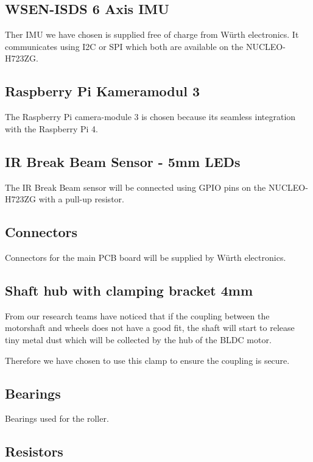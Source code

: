 \documentclass[a4paper,12pt]{article}
\begin{document}
  \subsection*{WSEN-ISDS 6 Axis IMU}

  Ther IMU we have chosen is supplied free of charge from Würth
  electronics. It communicates using I2C or SPI which both are available
  on the NUCLEO-H723ZG.

  \subsection*{Raspberry Pi Kameramodul 3}

  The Raspberry Pi camera-module 3 is chosen because its seamless
  integration with the Raspberry Pi 4.

  \subsection*{IR Break Beam Sensor - 5mm LEDs}

  The IR Break Beam sensor will be connected using GPIO pins on the
  NUCLEO-H723ZG with a pull-up resistor.

  \subsection*{Connectors}

  Connectors for the main PCB board will be supplied by Würth
  electronics.

  \subsection*{Shaft hub with clamping bracket 4mm}

  From our research teams have noticed that if the coupling between the
  motorshaft and wheels does not have a good fit, the shaft will start
  to release tiny metal dust which will be collected by the hub of the
  BLDC motor.

  Therefore we have chosen to use this clamp to ensure the coupling is
  secure.

  \subsection*{Bearings} Bearings used for the roller.

  \subsection*{Resistors}
\end{document}
